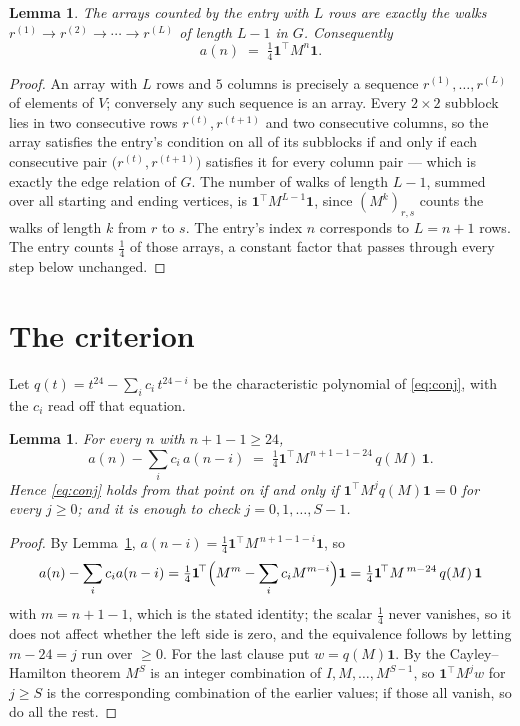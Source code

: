 \documentclass[11pt,a4paper]{article}
\theoremstyle{plain}
\newtheorem{lemma}[theorem]{Lemma}
\theoremstyle{definition}
\begin{document}
\begin{lemma}\label{lem:walk}
The arrays counted by the entry with $L$ rows are exactly the walks
$r^{(1)}\to r^{(2)}\to\cdots\to r^{(L)}$ of length $L-1$ in $G$. Consequently
\[
a(n)\;=\;\tfrac1{4}\mathbf{1}^{\!\top}M^{n}\mathbf{1} .
\]
\end{lemma}

\begin{proof}
An array with $L$ rows and $5$ columns is precisely a sequence
$r^{(1)},\dots,r^{(L)}$ of elements of $V$; conversely any such sequence is an array.
Every $2\times2$ subblock lies in two consecutive rows $r^{(t)},r^{(t+1)}$ and two
consecutive columns, so the array satisfies the entry's condition on all of its subblocks
if and only if each consecutive pair $\bigl(r^{(t)},r^{(t+1)}\bigr)$ satisfies it for
every column pair --- which is exactly the edge relation of $G$. The number of walks of
length $L-1$, summed over all starting and ending vertices, is
$\mathbf{1}^{\!\top}M^{L-1}\mathbf{1}$, since $(M^{k})_{r,s}$ counts the walks of
length $k$ from $r$ to $s$. The entry's index $n$ corresponds to $L=n+1$ rows. The entry counts $\tfrac1{4}$ of those arrays, a constant factor that passes through every step below unchanged.
\end{proof}

\section{The criterion}

Let $q(t)=t^{24}-\sum_i c_i\,t^{24-i}$ be the characteristic polynomial of
\eqref{eq:conj}, with the $c_i$ read off that equation.

\begin{lemma}\label{lem:crit}
For every $n$ with $n+1-1\ge24$,
\[
a(n)-\sum_i c_i\,a(n-i)\;=\;\tfrac1{4}\mathbf{1}^{\!\top}M^{\,n+1-1-24}\,q(M)\,\mathbf{1} .
\]
Hence \eqref{eq:conj} holds from that point on if and only if
$\mathbf{1}^{\!\top}M^{j}q(M)\mathbf{1}=0$ for every $j\ge0$; and it is enough to check
$j=0,1,\dots,S-1$.
\end{lemma}

\begin{proof}
By Lemma~\ref{lem:walk}, $a(n-i)=\tfrac1{4}\mathbf{1}^{\!\top}M^{\,n+1-1-i}\mathbf{1}$, so
\[
a(n)-\sum_i c_i a(n-i)
=\tfrac1{4}\mathbf{1}^{\!\top}\Bigl(M^{m}-\sum_i c_i M^{m-i}\Bigr)\mathbf{1}
=\tfrac1{4}\mathbf{1}^{\!\top}M^{\,m-24}\,q(M)\,\mathbf{1}
\]
with $m=n+1-1$, which is the stated identity; the scalar $\tfrac1{4}$ never vanishes, so it does not affect whether the left side is zero, and the equivalence follows by letting
$m-24=j$ run over $\ge0$. For the last clause put $w=q(M)\mathbf{1}$. By the
Cayley--Hamilton theorem $M^{S}$ is an integer combination of $I,M,\dots,M^{S-1}$, so
$\mathbf{1}^{\!\top}M^{j}w$ for $j\ge S$ is the corresponding combination of the earlier
values; if those all vanish, so do all the rest.
\end{proof}
\end{document}
